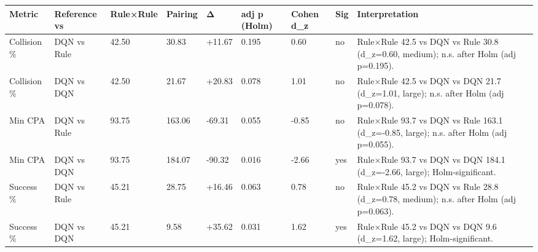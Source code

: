 \begin{tabular}{lllllllll}
\toprule
Metric & Reference vs & Rule×Rule & Pairing & Δ & adj p (Holm) & Cohen d\_z & Sig & Interpretation \\
\midrule
Collision \% & DQN vs Rule & 42.50 & 30.83 & +11.67 & 0.195 & 0.60 & no & Rule×Rule 42.5 vs DQN vs Rule 30.8 (d\_z=0.60, medium); n.s. after Holm (adj p=0.195). \\
Collision \% & DQN vs DQN & 42.50 & 21.67 & +20.83 & 0.078 & 1.01 & no & Rule×Rule 42.5 vs DQN vs DQN 21.7 (d\_z=1.01, large); n.s. after Holm (adj p=0.078). \\
Min CPA & DQN vs Rule & 93.75 & 163.06 & -69.31 & 0.055 & -0.85 & no & Rule×Rule 93.7 vs DQN vs Rule 163.1 (d\_z=-0.85, large); n.s. after Holm (adj p=0.055). \\
Min CPA & DQN vs DQN & 93.75 & 184.07 & -90.32 & 0.016 & -2.66 & yes & Rule×Rule 93.7 vs DQN vs DQN 184.1 (d\_z=-2.66, large); Holm-significant. \\
Success \% & DQN vs Rule & 45.21 & 28.75 & +16.46 & 0.063 & 0.78 & no & Rule×Rule 45.2 vs DQN vs Rule 28.8 (d\_z=0.78, medium); n.s. after Holm (adj p=0.063). \\
Success \% & DQN vs DQN & 45.21 & 9.58 & +35.62 & 0.031 & 1.62 & yes & Rule×Rule 45.2 vs DQN vs DQN 9.6 (d\_z=1.62, large); Holm-significant. \\
\bottomrule
\end{tabular}
